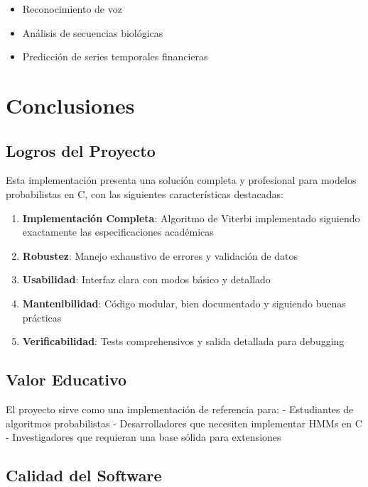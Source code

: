\documentclass[
]{article}
\providecommand{\tightlist}{%
  \setlength{\itemsep}{0pt}\setlength{\parskip}{0pt}}
\begin{document}
\begin{itemize}
\tightlist
\item
  Reconocimiento de voz
\item
  Análisis de secuencias biológicas
\item
  Predicción de series temporales financieras
\end{itemize}

\section{Conclusiones}\label{conclusiones}

\subsection{Logros del Proyecto}\label{logros-del-proyecto}

Esta implementación presenta una solución completa y profesional para
modelos probabilistas en C, con las siguientes características
destacadas:

\begin{enumerate}
\def\labelenumi{\arabic{enumi}.}
\tightlist
\item
  \textbf{Implementación Completa}: Algoritmo de Viterbi implementado
  siguiendo exactamente las especificaciones académicas
\item
  \textbf{Robustez}: Manejo exhaustivo de errores y validación de datos
\item
  \textbf{Usabilidad}: Interfaz clara con modos básico y detallado
\item
  \textbf{Mantenibilidad}: Código modular, bien documentado y siguiendo
  buenas prácticas
\item
  \textbf{Verificabilidad}: Tests comprehensivos y salida detallada para
  debugging
\end{enumerate}

\subsection{Valor Educativo}\label{valor-educativo}

El proyecto sirve como una implementación de referencia para: -
Estudiantes de algoritmos probabilistas - Desarrolladores que necesiten
implementar HMMs en C - Investigadores que requieran una base sólida
para extensiones

\subsection{Calidad del Software}\label{calidad-del-software}
\end{document}
